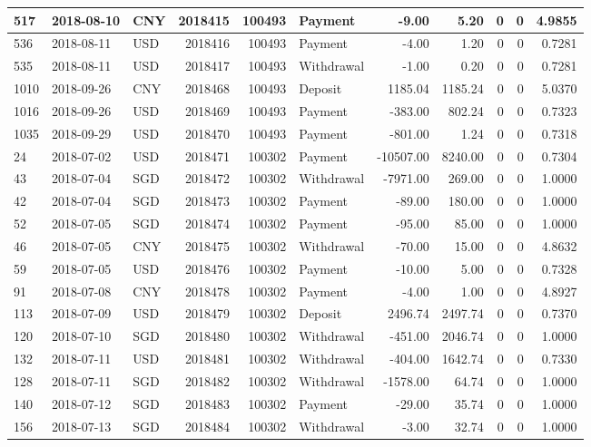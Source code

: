 \documentclass[]{article}
\begin{document}
\begin{table}[H]
\begin{tabular}{l|l|l|r|r|l|r|r|r|r|r}
\hline
517 & 2018-08-10 & CNY & 2018415 & 100493 & Payment & -9.00 & 5.20 & 0 & 0 & 4.9855\\
\hline
536 & 2018-08-11 & USD & 2018416 & 100493 & Payment & -4.00 & 1.20 & 0 & 0 & 0.7281\\
\hline
535 & 2018-08-11 & USD & 2018417 & 100493 & Withdrawal & -1.00 & 0.20 & 0 & 0 & 0.7281\\
\hline
1010 & 2018-09-26 & CNY & 2018468 & 100493 & Deposit & 1185.04 & 1185.24 & 0 & 0 & 5.0370\\
\hline
1016 & 2018-09-26 & USD & 2018469 & 100493 & Payment & -383.00 & 802.24 & 0 & 0 & 0.7323\\
\hline
1035 & 2018-09-29 & USD & 2018470 & 100493 & Payment & -801.00 & 1.24 & 0 & 0 & 0.7318\\
\hline
24 & 2018-07-02 & USD & 2018471 & 100302 & Payment & -10507.00 & 8240.00 & 0 & 0 & 0.7304\\
\hline
43 & 2018-07-04 & SGD & 2018472 & 100302 & Withdrawal & -7971.00 & 269.00 & 0 & 0 & 1.0000\\
\hline
42 & 2018-07-04 & SGD & 2018473 & 100302 & Payment & -89.00 & 180.00 & 0 & 0 & 1.0000\\
\hline
52 & 2018-07-05 & SGD & 2018474 & 100302 & Payment & -95.00 & 85.00 & 0 & 0 & 1.0000\\
\hline
46 & 2018-07-05 & CNY & 2018475 & 100302 & Withdrawal & -70.00 & 15.00 & 0 & 0 & 4.8632\\
\hline
59 & 2018-07-05 & USD & 2018476 & 100302 & Payment & -10.00 & 5.00 & 0 & 0 & 0.7328\\
\hline
91 & 2018-07-08 & CNY & 2018478 & 100302 & Payment & -4.00 & 1.00 & 0 & 0 & 4.8927\\
\hline
113 & 2018-07-09 & USD & 2018479 & 100302 & Deposit & 2496.74 & 2497.74 & 0 & 0 & 0.7370\\
\hline
120 & 2018-07-10 & SGD & 2018480 & 100302 & Withdrawal & -451.00 & 2046.74 & 0 & 0 & 1.0000\\
\hline
132 & 2018-07-11 & USD & 2018481 & 100302 & Withdrawal & -404.00 & 1642.74 & 0 & 0 & 0.7330\\
\hline
128 & 2018-07-11 & SGD & 2018482 & 100302 & Withdrawal & -1578.00 & 64.74 & 0 & 0 & 1.0000\\
\hline
140 & 2018-07-12 & SGD & 2018483 & 100302 & Payment & -29.00 & 35.74 & 0 & 0 & 1.0000\\
\hline
156 & 2018-07-13 & SGD & 2018484 & 100302 & Withdrawal & -3.00 & 32.74 & 0 & 0 & 1.0000\\
\hline

\end{tabular}
\end{table}
\end{document}
